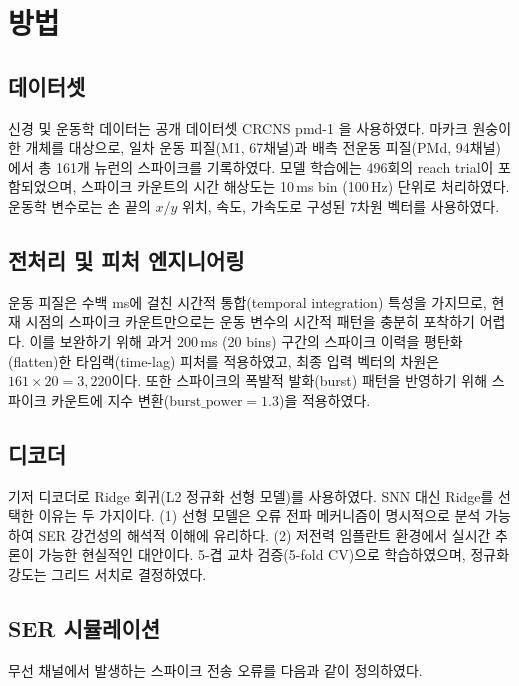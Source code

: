 \documentclass[12pt, a4paper]{article}
\begin{document}
\section{방법}

\subsection{데이터셋}

신경 및 운동학 데이터는 공개 데이터셋 CRCNS pmd-1 \cite{perich2018} 을 사용하였다.
마카크 원숭이 한 개체를 대상으로, 일차 운동 피질(M1, 67채널)과 배측 전운동 피질(PMd, 94채널)에서
총 161개 뉴런의 스파이크를 기록하였다.
모델 학습에는 496회의 reach trial이 포함되었으며,
스파이크 카운트의 시간 해상도는 10\,ms bin (100\,Hz) 단위로 처리하였다.
운동학 변수로는 손 끝의 $x/y$ 위치, 속도, 가속도로 구성된 7차원 벡터를 사용하였다.

\subsection{전처리 및 피처 엔지니어링}

운동 피질은 수백 ms에 걸친 시간적 통합(temporal integration) 특성을 가지므로,
현재 시점의 스파이크 카운트만으로는 운동 변수의 시간적 패턴을 충분히 포착하기 어렵다.
이를 보완하기 위해 과거 200\,ms (20 bins) 구간의 스파이크 이력을 평탄화(flatten)한
타임랙(time-lag) 피처를 적용하였고, 최종 입력 벡터의 차원은 $161 \times 20 = 3{,}220$이다.
또한 스파이크의 폭발적 발화(burst) 패턴을 반영하기 위해
스파이크 카운트에 지수 변환($\text{burst\_power} = 1.3$)을 적용하였다.

\subsection{디코더}

기저 디코더로 Ridge 회귀(L2 정규화 선형 모델)를 사용하였다.
SNN 대신 Ridge를 선택한 이유는 두 가지이다.
(1) 선형 모델은 오류 전파 메커니즘이 명시적으로 분석 가능하여
SER 강건성의 해석적 이해에 유리하다.
(2) 저전력 임플란트 환경에서 실시간 추론이 가능한 현실적인 대안이다.
5-겹 교차 검증(5-fold CV)으로 학습하였으며, 정규화 강도는 그리드 서치로 결정하였다.

\subsection{SER 시뮬레이션}

무선 채널에서 발생하는 스파이크 전송 오류를 다음과 같이 정의하였다.
\end{document}
